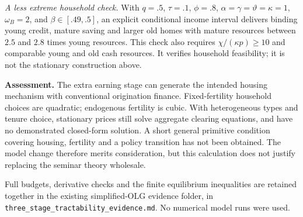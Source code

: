 \documentclass[11pt]{article}
\begin{document}
\textit{A less extreme household check.} With $q=.5$, $\tau=.1$, $\phi=.8$,
$\alpha=\gamma=\vartheta=\kappa=1$, $\omega_B=2$, and
$\beta\in[.49,.5]$, an explicit conditional income interval delivers binding
young credit, mature saving and larger old homes with mature resources between
$2.5$ and $2.8$ times young resources. This check also requires
$\chi/(\kappa p)\ge10$ and comparable young and old cash resources.
It verifies household feasibility; it is not the stationary construction above.

\textbf{Assessment.} The extra earning stage can generate the intended housing
mechanism with conventional origination finance. Fixed-fertility household
choices are quadratic; endogenous fertility is cubic. With heterogeneous types
and tenure choice, stationary prices still solve aggregate clearing equations,
and have no demonstrated closed-form solution. A short general primitive
condition covering housing, fertility and a policy transition has not been
obtained. The model change therefore merits consideration, but this calculation
does not justify replacing the seminar theory wholesale.

\small Full budgets, derivative checks and the finite equilibrium inequalities
are retained together in the existing simplified-OLG evidence folder,
in \nolinkurl{three_stage_tractability_evidence.md}. No numerical model runs were used.
\end{document}
